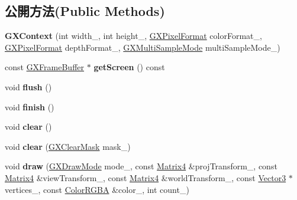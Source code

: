 \subsection*{公開方法(Public Methods)}
\begin{DoxyCompactItemize}
\item 
{\bfseries G\+X\+Context} (int width\+\_\+, int height\+\_\+, \hyperlink{class_magnum_1_1_g_x_pixel_format}{G\+X\+Pixel\+Format} color\+Format\+\_\+, \hyperlink{class_magnum_1_1_g_x_pixel_format}{G\+X\+Pixel\+Format} depth\+Format\+\_\+, \hyperlink{class_magnum_1_1_g_x_multi_sample_mode}{G\+X\+Multi\+Sample\+Mode} multi\+Sample\+Mode\+\_\+)\hypertarget{class_magnum_1_1_g_x_context_a4ec59eea395c067216c0245c6d486672}{}\label{class_magnum_1_1_g_x_context_a4ec59eea395c067216c0245c6d486672}

\item 
const \hyperlink{class_magnum_1_1_g_x_frame_buffer}{G\+X\+Frame\+Buffer} $\ast$ {\bfseries get\+Screen} () const \hypertarget{class_magnum_1_1_g_x_context_a49d48f7981f76fc3030700d9ee3e28ef}{}\label{class_magnum_1_1_g_x_context_a49d48f7981f76fc3030700d9ee3e28ef}

\item 
void {\bfseries flush} ()\hypertarget{class_magnum_1_1_g_x_context_a36462301294a68de6c99c3599e370ad0}{}\label{class_magnum_1_1_g_x_context_a36462301294a68de6c99c3599e370ad0}

\item 
void {\bfseries finish} ()\hypertarget{class_magnum_1_1_g_x_context_a9536ca0668294067af79fb6404b864de}{}\label{class_magnum_1_1_g_x_context_a9536ca0668294067af79fb6404b864de}

\item 
void {\bfseries clear} ()\hypertarget{class_magnum_1_1_g_x_context_aec5c070800c9b82965223c13ae810b88}{}\label{class_magnum_1_1_g_x_context_aec5c070800c9b82965223c13ae810b88}

\item 
void {\bfseries clear} (\hyperlink{class_magnum_1_1_g_x_clear_mask}{G\+X\+Clear\+Mask} mask\+\_\+)\hypertarget{class_magnum_1_1_g_x_context_aed4b8bad3ea948cc0168b48ecd020cf4}{}\label{class_magnum_1_1_g_x_context_aed4b8bad3ea948cc0168b48ecd020cf4}

\item 
void {\bfseries draw} (\hyperlink{class_magnum_1_1_g_x_draw_mode}{G\+X\+Draw\+Mode} mode\+\_\+, const \hyperlink{class_magnum_1_1_matrix4}{Matrix4} \&proj\+Transform\+\_\+, const \hyperlink{class_magnum_1_1_matrix4}{Matrix4} \&view\+Transform\+\_\+, const \hyperlink{class_magnum_1_1_matrix4}{Matrix4} \&world\+Transform\+\_\+, const \hyperlink{class_magnum_1_1_vector3}{Vector3} $\ast$vertices\+\_\+, const \hyperlink{class_magnum_1_1_color_r_g_b_a}{Color\+R\+G\+BA} \&color\+\_\+, int count\+\_\+)\hypertarget{class_magnum_1_1_g_x_context_a30c06e65573d46cfd20e52c764fb9f40}{}\label{class_magnum_1_1_g_x_context_a30c06e65573d46cfd20e52c764fb9f40}


\end{DoxyCompactItemize}
